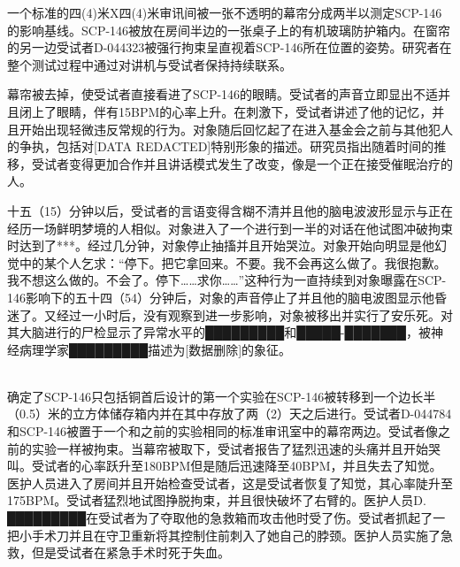 一个标准的四(4)米X四(4)米审讯间被一张不透明的幕帘分成两半以测定SCP-146的影响基线。SCP-146被放在房间半边的一张桌子上的有机玻璃防护箱内。在窗帘的另一边受试者D-044323被强行拘束呈直视着SCP-146所在位置的姿势。研究者在整个测试过程中通过对讲机与受试者保持持续联系。

幕帘被去掉，使受试者直接看进了SCP-146的眼睛。受试者的声音立即显出不适并且闭上了眼睛，伴有15BPM的心率上升。在刺激下，受试者讲述了他的记忆，并且开始出现轻微违反常规的行为。对象随后回忆起了在进入基金会之前与其他犯人的争执，包括对{[}DATA REDACTED]特别形象的描述。研究员指出随着时间的推移，受试者变得更加合作并且讲话模式发生了改变，像是一个正在接受催眠治疗的人。

十五（15）分钟以后，受试者的言语变得含糊不清并且他的脑电波波形显示与正在经历一场鲜明梦境的人相似。对象进入了一个进行到一半的对话在他试图冲破拘束时达到了***。经过几分钟，对象停止抽搐并且开始哭泣。对象开始向明显是他幻觉中的某个人乞求：“停下。把它拿回来。不要。我不会再这么做了。我很抱歉。我不想这么做的。不会了。停下……求你……”这种行为一直持续到对象曝露在SCP-146影响下的五十四（54）分钟后，对象的声音停止了并且他的脑电波图显示他昏迷了。又经过一小时后，没有观察到进一步影响，对象被移出并实行了安乐死。对其大脑进行的尸检显示了异常水平的█████████和█████-███████，被神经病理学家█████████描述为{[}数据删除]的象征。


\\
确定了SCP-146只包括铜首后设计的第一个实验在SCP-146被转移到一个边长半（0.5）米的立方体储存箱内并在其中存放了两（2）天之后进行。受试者D-044784和SCP-146被置于一个和之前的实验相同的标准审讯室中的幕帘两边。受试者像之前的实验一样被拘束。当幕帘被取下，受试者报告了猛烈迅速的头痛并且开始哭叫。受试者的心率跃升至180BPM但是随后迅速降至40BPM，并且失去了知觉。医护人员进入了房间并且开始检查受试者，这是受试者恢复了知觉，其心率陡升至175BPM。受试者猛烈地试图挣脱拘束，并且很快破坏了右臂的。医护人员D. █████████在受试者为了夺取他的急救箱而攻击他时受了伤。受试者抓起了一把小手术刀并且在守卫重新将其控制住前刺入了她自己的脖颈。医护人员实施了急救，但是受试者在紧急手术时死于失血。

